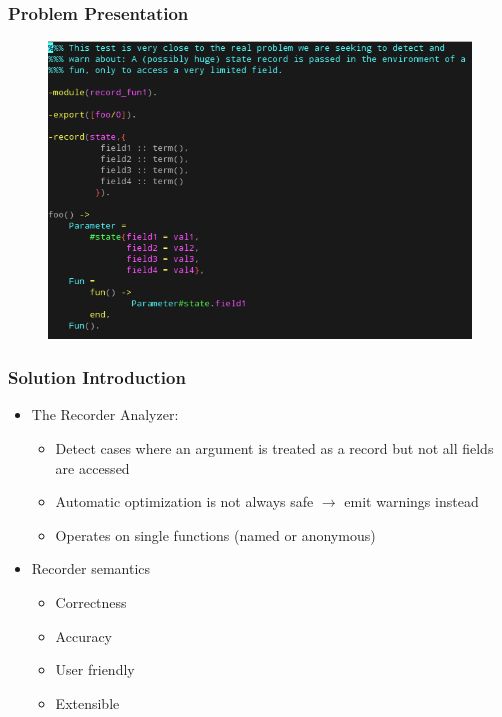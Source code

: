 \begin{frame}
  \frametitle{Problem Presentation}
  
  \begin{figure}
    \centering
    \includegraphics[scale=0.45]{../figures/problem_introduction}
  \end{figure}
  
\end{frame}

\begin{frame}
  \frametitle{Solution Introduction}
  
  \begin{itemize}
  \item The Recorder Analyzer:
    \begin{itemize}
    \item Detect cases where an argument is treated as a record but not all
      fields are accessed
    \item Automatic optimization is not always safe $\to$ emit warnings instead
    \item Operates on single functions (named or anonymous)
    \end{itemize}
  \item Recorder semantics
    \begin{itemize}
    \item Correctness
    \item Accuracy
    \item User friendly
    \item Extensible
    \end{itemize}
  \end{itemize}
  
\end{frame}

